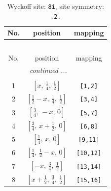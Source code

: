 \documentclass[fleqn,8pt]{jsarticle}
\begin{document}
\begin{longtable}{ccc}
\caption{Wyckoff site: {\tt 8i}, site symmetry: {\tt .2.}}
 \\
 \hline \hline
No. & position & mapping \\ \hline \endfirsthead

\multicolumn{2}{l}{\tablename\ \thetable{}} \\
 \hline \hline
No. & position & mapping \\ \hline \endhead

 \hline \hline
\multicolumn{2}{r}{\footnotesize\it continued ...} \\ \endfoot

 \hline \hline
\multicolumn{2}{r}{} \\ \endlastfoot

1 & $\left[ x,\, \frac{1}{4},\, \frac{1}{2} \right]$ & {\tt [1,2]} \\ \hline
2 & $\left[ \frac{1}{2} - x,\, \frac{1}{4},\, \frac{1}{2} \right]$ & {\tt [3,4]} \\ \hline
3 & $\left[ \frac{3}{4},\, - x,\, 0 \right]$ & {\tt [5,7]} \\ \hline
4 & $\left[ \frac{3}{4},\, x + \frac{1}{2},\, 0 \right]$ & {\tt [6,8]} \\ \hline
5 & $\left[ \frac{1}{4},\, x,\, 0 \right]$ & {\tt [9,11]} \\ \hline
6 & $\left[ \frac{1}{4},\, \frac{1}{2} - x,\, 0 \right]$ & {\tt [10,12]} \\ \hline
7 & $\left[ - x,\, \frac{3}{4},\, \frac{1}{2} \right]$ & {\tt [13,14]} \\ \hline
8 & $\left[ x + \frac{1}{2},\, \frac{3}{4},\, \frac{1}{2} \right]$ & {\tt [15,16]} \\
\end{longtable}
\renewcommand{\arraystretch}{1.2}
\end{document}

